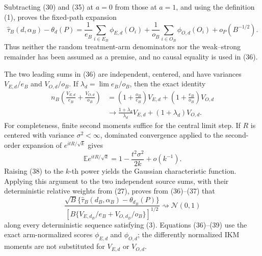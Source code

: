 Subtracting (30) and (35) at \(a=0\) from those at \(a=1\), and using the definition (1), proves the fixed-path expansion
\[
 \widehat\tau_B(d,\alpha_B)-\theta_d(P)
 =\frac1{e_B}\sum_{i\in E_B}\phi_{E,d}(O_i)
  +\frac1{o_B}\sum_{i\in O_B}\phi_{O,d}(O_i)
  +o_P(B^{-1/2}).                                            \tag{36}
\]
Thus neither the random treatment-arm denominators nor the weak--strong remainder has been assumed as a premise, and no causal equality is used in (36).

The two leading sums in (36) are independent, centered, and have variances \(V_{E,d}/e_B\) and \(V_{O,d}/o_B\).  If \(\lambda_d=\lim e_B/o_B\), then the exact identity
\[
\begin{aligned}
 n_B\left(\frac{V_{E,d}}{e_B}+\frac{V_{O,d}}{o_B}\right)
 &=\left(1+\frac{o_B}{e_B}\right)V_{E,d}
  +\left(1+\frac{e_B}{o_B}\right)V_{O,d}\\
 &\longrightarrow
 \frac{1+\lambda_d}{\lambda_d}V_{E,d}
 +(1+\lambda_d)V_{O,d}.
\end{aligned}                                                \tag{37}
\]
For completeness, finite second moments suffice for the central limit step.  If \(R\) is centered with variance \(\sigma^2<\infty\), dominated convergence applied to the second-order expansion of \(e^{itR/\sqrt{k}}\) gives
\[
 \mathbb E e^{itR/\sqrt{k}}
 =1-\frac{t^2\sigma^2}{2k}+o(k^{-1}).                       \tag{38}
\]
Raising (38) to the \(k\)-th power yields the Gaussian characteristic function.  Applying this argument to the two independent source sums, with their deterministic relative weights from (27), proves from (36)--(37) that
\[
 \frac{\sqrt B\{\widehat\tau_B(d_B,\alpha_B)-\theta_{d_B}(P)\}}
 {\left[B\{V_{E,d_B}/e_B+V_{O,d_B}/o_B\}\right]^{1/2}}
 \rightsquigarrow\mathcal N(0,1)                            \tag{39}
\]
along every deterministic sequence satisfying (3).  Equations (36)--(39) use the exact arm-normalized scores \(\phi_{E,d}\) and \(\phi_{O,d}\); the differently normalized IKM moments are not substituted for \(V_{E,d}\) or \(V_{O,d}\).

